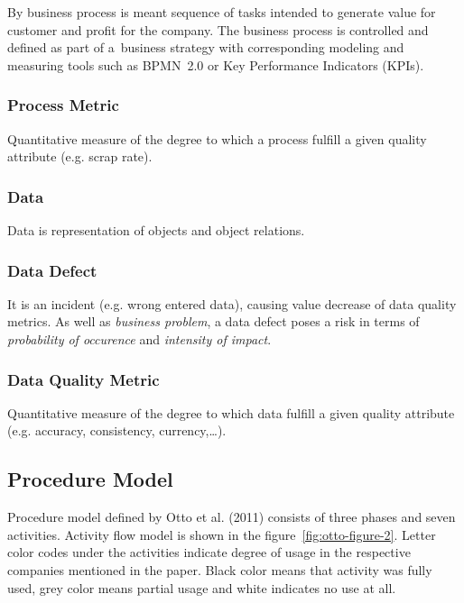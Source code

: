 By business process is meant sequence of tasks intended to generate value for customer and profit for the company.
The business process is controlled and defined as part of a~business strategy with corresponding modeling and measuring tools such as BPMN~2.0 or Key Performance Indicators (KPIs).

\subsubsection{Process Metric}

Quantitative measure of the degree to which a process fulfill a given quality attribute (e.g. scrap rate).

\subsubsection{Data}

Data is representation of objects and object relations.

\subsubsection{Data Defect}

It is an incident (e.g. wrong entered data), causing value decrease of data quality metrics.
As well as \textit{business problem}, a data defect poses a risk in terms of \textit{probability of occurence} and \textit{intensity of impact}.

\subsubsection{Data Quality Metric}

Quantitative measure of the degree to which data fulfill a given quality attribute (e.g. accuracy, consistency, currency,\ldots).

\subsection{Procedure Model}\label{subsec:procedure-model}

Procedure model defined by Otto et al. (2011) consists of three phases and seven activities.
Activity flow model is shown in the figure~\ref{fig:otto-figure-2}.
Letter color codes under the activities indicate degree of usage in the respective companies mentioned in the paper.
Black color means that activity was fully used, grey color means partial usage and white indicates no use at all.

